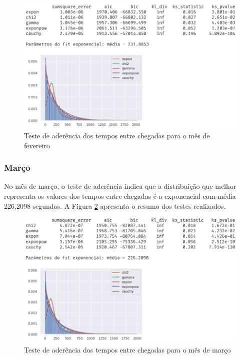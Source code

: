 \begin{figure}[H]
    \includegraphics[scale=0.8]{analise-de-dados/fit/fit-fevereiro.png}
    \caption{Teste de aderência dos tempos entre chegadas para o mês de fevereiro}
    \label{fig: fit-fevereiro}
\end{figure}

\subsubsection*{Março}
No mês de março, o teste de aderência indica que a distribuição que melhor representa os valores dos tempos entre chegadas é a exponencial com média 226,2098 segundos. A Figura \ref*{fig: fit-marco} apresenta o resumo dos testes realizados.

\begin{figure}[H]
    \includegraphics[scale=0.8]{analise-de-dados/fit/fit-marco.png}
    \caption{Teste de aderência dos tempos entre chegadas para o mês de março}
    \label{fig: fit-marco}
\end{figure}

